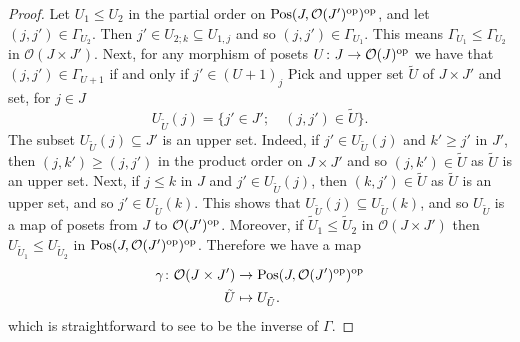 \documentclass{article}
\theoremstyle{definition}
\newcommand{\Oo}{\mathcal{O}}
\newcommand{\pos}{\textnormal{Pos}}
\newcommand{\op}{\textnormal{op}}
\newcommand{\gr}{\Gamma}
\begin{document}
\begin{proof}
Let $U_1\leq U_2$ in the partial order on $\pos(J,\Oo(J')^\op)^\op$, and let $(j,j')\in \gr_{U_2}$. Then $j'\in U_{2;k}\subseteq U_{1,j}$ and so $(j,j')\in \gr_{U_1}$. This means $\gr_{U_1}\leq \gr_{U_2}$ in $\Oo(J \times J')$. Next, for any morphism of posets $U\colon J\to \Oo(J)^\op$ we have that $(j,j')\in \Gamma_{U+1}$ if and only if $j'\in (U+1)_j$
  Pick and upper set $\tilde{U}$ of $J \times J'$ and set, for $j \in J$ $$U_{\tilde{U}}(j)=\{ j' \in J'; \quad  (j,j') \in \tilde{U} \}.$$
  The subset $U_{\tilde{U}}(j)\subseteq J'$ is an upper set. Indeed, if $j'\in U_{\tilde{U}}(j)$ and $k'\geq j'$ in $J'$, then $(j,k')\geq (j,j')$ in the product order on $J\times J'$ and so $(j,k')\in \tilde{U}$ as $\tilde{U}$ is an upper set. Next, if $j\leq k$ in $J$ and $j'\in U_{\tilde{U}}(j)$, then $(k,j')\in \tilde{U}$ as $\tilde{U}$ is an upper set, and so $j'\in U_{\tilde{U}}(k)$. This shows that $U_{\tilde{U}}(j)\subseteq U_{\tilde{U}}(k)$, and so $U_{\tilde{U}}$ is a map of posets from $J$ to $\Oo(J')^\op$. Moreover, if $\tilde{U}_1\leq \tilde{U}_2$ in $\Oo(J\times J')$ then $U_{\tilde{U}_1}\leq U_{\tilde{U}_2}$ in $\pos(J,\Oo(J')^\op)^\op$. Therefore we have a map
   \begin{align*}
\gamma\colon   \Oo(J \times J') &\to \pos(J,\Oo(J')^\op)^\op \\
  \tilde{U} & \mapsto U_{\tilde{U}}.
  \end{align*}
  which is straightforward to see to be the inverse of $\gr$. 
\end{proof}
\end{document}

